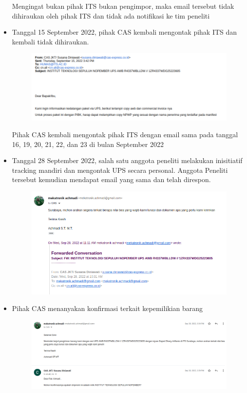 \documentclass{article} %
\begin{document}
\begin{itemize}
		Mengingat bukan pihak ITS bukan pengimpor, maka email tersebut tidak dihiraukan oleh pihak ITS dan tidak ada notifikasi ke tim peneliti
		
		\item Tanggal 15 September 2022, pihak CAS kembali mengontak pihak ITS dan kembali tidak dihiraukan.
		
		\begin{figure}[!ht]
			\centering
			\includegraphics[width=400pt]{images/impor_2}
		\end{figure}
	
		Pihak CAS kembali mengontak pihak ITS dengan email sama pada tanggal 16, 19, 20, 21, 22, dan 23 di bulan September 2022
		
		\newpage
		\item Tanggal 28 September 2022, salah satu anggota peneliti melakukan inisitiatif tracking mandiri dan mengontak UPS secara personal.
		Anggota Peneliti tersebut kemudian mendapat email yang sama dan telah direspon.
		
		\begin{figure}[!ht]
			\centering
			\includegraphics[width=400pt]{images/impor_3}
		\end{figure}
	
		\item Pihak CAS menanyakan konfirmasi terkait kepemilikian barang
		
		\begin{figure}[!ht]
			\centering
			\includegraphics[width=400pt]{images/impor_4}
		\end{figure}
	

\end{itemize}
\end{document}
